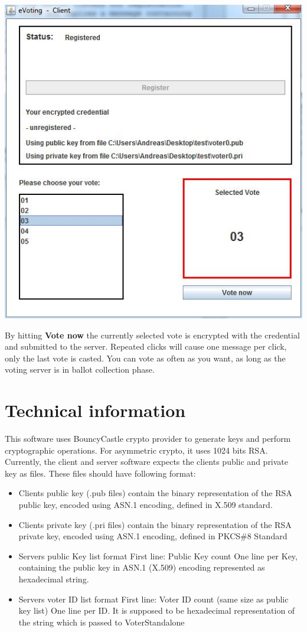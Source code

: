 \documentclass{article}
\begin{document}
\begin{center}
\includegraphics{./clientregistered.jpg}
\end{center}
By hitting \textbf{Vote now} the currently selected vote is encrypted with the credential and submitted to the server. Repeated clicks will cause one message per click, only the last vote is casted. You can vote as often as you want, as long as  the voting server is in ballot collection phase.

\section{Technical information}
This software uses BouncyCastle crypto provider to generate keys and perform cryptographic operations. For asymmetric crypto, it uses 1024 bits RSA. Currently, the client and server software expects the clients public and private key as files. 
These files should have following format:
\begin{itemize}
	\item Clients public key (.pub files) contain the binary representation of the RSA public key, encoded using ASN.1 encoding, defined in X.509 standard.
	\item Clients private key (.pri files) contain the binary representation of the RSA private key, encoded using ASN.1 encoding, defined in PKCS\#8 Standard
	\item Servers public Key list format
		\subitem First line: Public Key count
		\subitem One line per Key, containing the public key in ASN.1 (X.509) encoding represented as hexadecimal string.
	\item Servers voter ID list format
		\subitem First line: Voter ID count (same size as public key list)
		\subitem One line per ID. It is supposed to be hexadecimal representation of the string which is passed to VoterStandalone
\end{itemize}



\end{document}
